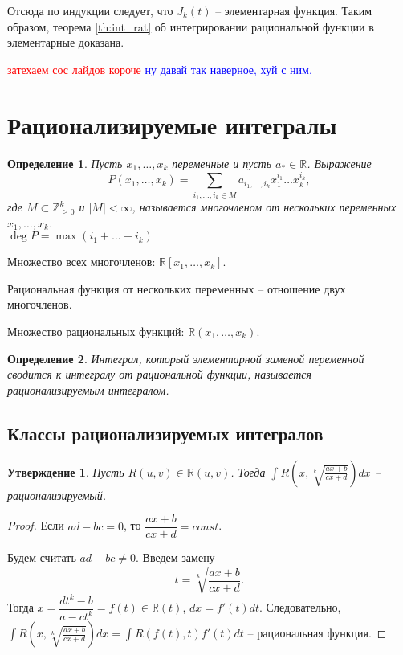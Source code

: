 \documentclass{article}
\theoremstyle{plain}
\newtheorem{claim}{Утверждение}
\newtheorem{definition}{Определение}
\theoremstyle{definition}
\theoremstyle{remark}
\begin{document}
Отсюда по индукции следует, что $J_k(t)$ -- элементарная функция. Таким образом, теорема \ref{th:int_rat} об интегрировании рациональной функции в элементарные доказана.

\textcolor{red}{затехаем сос лайдов короче}
\textcolor{blue}{ну давай так наверное, хуй с ним.}



\section{Рационализируемые интегралы}
\begin{definition}
Пусть $x_1, \ldots, x_k$ переменные и пусть $a_{*} \in\mathbb{R}$. Выражение $$P(x_1, \ldots, x_k) = \sum_{i_1, \ldots, i_k \in M} a_{i_1, \ldots, i_k}x_1^{i_1} \ldots x_k^{i_k},$$ где $M\subset \mathbb{Z}_{\geq 0}^{k}$ и $|M| < \infty$, называется многочленом от нескольких переменных $x_1, \ldots, x_k$.\\

\noindent $\deg P= \max(i_1+ \ldots + i_k)$
\end{definition}
\noindent Множество всех многочленов: $\mathbb{R}[x_1, \ldots, x_k]$.

\noindent Рациональная функция от нескольких переменных -- отношение двух многочленов.

\noindent Множество рациональных функций: $\mathbb{R}(x_1, \ldots, x_k)$.

\begin{definition}
Интеграл, который элементарной заменой переменной сводится к интегралу от рациональной функции, называется рационализируемым интегралом.
\end{definition}

\subsection{Классы рационализируемых интегралов}
\begin{claim}\label{cl:rat_root}
Пусть $R(u, v) \in\mathbb{R}(u, v)$. Тогда $\displaystyle \int R\left(x, \sqrt[k]{\frac{ax+b}{cx+d}}\right)dx$ -- рационализируемый.
\end{claim}
\begin{proof}
Если $ad-bc=0$, то $\dfrac{ax+b}{cx+d}=const$.

Будем считать $ad-bc\neq 0$. Введем замену $$t = \sqrt[k]{\dfrac{ax+b}{cx+d}}.$$ Тогда $x = \dfrac{dt^k-b}{a-ct^k}=f(t)\in\mathbb{R}(t)$, $dx=f'(t)dt$. Следовательно, $\displaystyle \int R\left(x, \sqrt[k]{\frac{ax+b}{cx+d}}\right)dx = \int R(f(t),t)f'(t)dt$ -- рациональная функция.
\end{proof}
\end{document}
